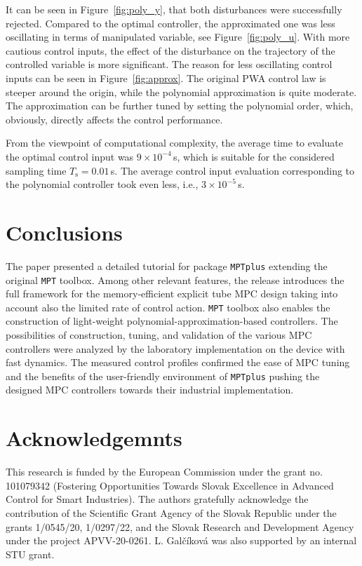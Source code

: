 \documentclass[letterpaper, 10 pt, conference]{ieeeconf}
\begin{document}
	It can be seen in Figure~\ref{fig:poly_y}, that both disturbances were successfully rejected. Compared to the optimal controller, the approximated one was less oscillating in terms of manipulated variable, see Figure~\ref{fig:poly_u}. With more cautious control inputs, the effect of the disturbance on the trajectory of the controlled variable is more significant. The reason for less oscillating control inputs can be seen in Figure~\ref{fig:approx}. The original PWA control law is steeper around the origin, while the polynomial approximation is quite moderate. The approximation can be further tuned by setting the polynomial order, which, obviously, directly affects the control performance.
	
	From the viewpoint of computational complexity, the average time to evaluate the optimal control input was $9 \times 10^{-4}$\,s, which is suitable for the considered sampling time $T_\mathrm{s} = 0.01$\,s. The average control input evaluation corresponding to the polynomial controller took even less, i.e., $3 \times 10^{-5}$\,s. 
	
	
	\section{Conclusions}
	\label{sec:conclusions}
	
	The paper presented a detailed tutorial for package \texttt{MPTplus} extending the original \texttt{MPT} toolbox. Among other relevant features, the release introduces the full framework for the memory-efficient explicit tube MPC design taking into account also the limited rate of control action. \texttt{MPT} toolbox also enables the construction of light-weight polynomial-approximation-based controllers. The possibilities of construction, tuning, and validation of the various MPC controllers were analyzed by the laboratory implementation on the device with fast dynamics. The measured control profiles confirmed the ease of MPC tuning and the benefits of the user-friendly environment of \texttt{MPTplus} pushing the designed MPC controllers towards their industrial implementation.
	
	\addtolength{\textheight}{-12cm}
	
	\section*{Acknowledgemnts}
	
	\small{
		This research is funded by the European Commission under the grant no. 101079342 (Fostering Opportunities Towards Slovak Excellence in Advanced Control for Smart Industries). The authors gratefully acknowledge the contribution of the Scientific Grant Agency of the Slovak Republic under the grants 1/0545/20, 1/0297/22, and the Slovak Research and Development Agency under the project APVV-20-0261. L. Galčíková was also supported by an internal STU grant. 
	}
	
	
	
	
	
\end{document}
